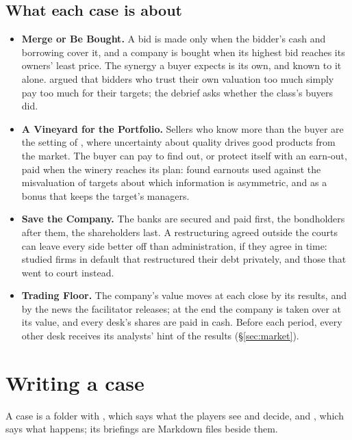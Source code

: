 \subsection{What each case is about}
\begin{itemize}
  \item \textbf{Merge or Be Bought.} A bid is made only when the bidder's cash and borrowing cover it, and a company
    is bought when its highest bid reaches its owners' least price. The synergy a buyer expects is its own, and
    known to it alone.  argued that bidders who trust their own valuation too much simply
    pay too much for their targets; the debrief asks whether the class's buyers did.
  \item \textbf{A Vineyard for the Portfolio.} Sellers who know more than the buyer are the setting of
    , where uncertainty about quality drives good products from the market. The
    buyer can pay to find out, or protect itself with an earn-out, paid when the winery reaches its plan:
     found earnouts used against the misvaluation of targets about which
    information is asymmetric, and as a bonus that keeps the target's managers.
  \item \textbf{Save the Company.} The banks are secured and paid first, the bondholders after them, the
    shareholders last. A restructuring agreed outside the courts can leave every side better off than
    administration, if they agree in time:  studied firms in default
    that restructured their debt privately, and those that went to court instead.
  \item \textbf{Trading Floor.} The company's value moves at each close by its results, and by the news the
    facilitator releases; at the end the company is taken over at its value, and every desk's shares are paid in
    cash. Before each period, every other desk receives its analysts' hint of the results (\S\ref{sec:market}).
\end{itemize}

\section{Writing a case}\label{sec:writing}
A case is a folder with , which says what the players see and decide, and , which
says what happens; its briefings are Markdown files beside them.

